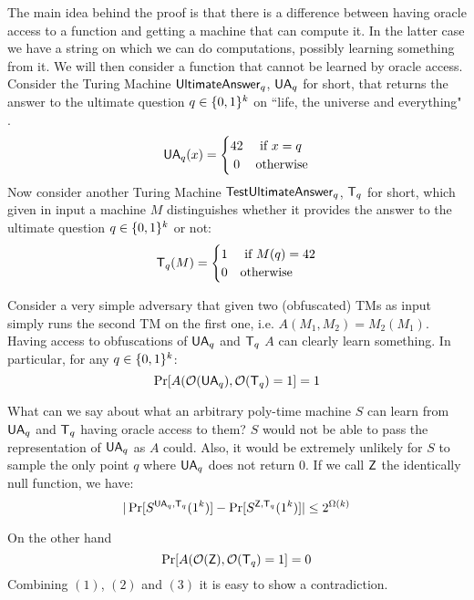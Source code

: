 The main idea behind the proof is that there is a difference between having oracle access to a function and getting a machine that can compute it. In the latter case we have a string on which we can do computations, possibly learning something from it.
We will then consider a function that cannot be learned by oracle access. Consider the Turing Machine
 $\mathsf{UltimateAnswer}_q$, $\mathsf{UA}_q$ for short, that returns the 
 answer to the ultimate question $q \in \{0,1\}^k$ on ``life, the universe and everything" \cite{adams}.
\[
\UA_q(x) =
\begin{cases} 
\hfill 42    \hfill & \text{ if $x = q$} \\
\hfill 0 \hfill & \text{otherwise} \\
\end{cases}
\]
Now consider another Turing Machine $\mathsf{TestUltimateAnswer}_q$, $\mathsf{T}_q$ for short, which given in input a machine $M$ distinguishes whether it provides the answer to the ultimate question $q \in \{0,1\}^k$ or not:
\[
\T_q(M) =
\begin{cases} 
\hfill 1    \hfill & \text{ if $M(q) = 42$} \\
\hfill 0 \hfill & \text{otherwise} \\
\end{cases}
\]

Consider a very simple adversary that given two (obfuscated) TMs as input simply runs the second TM on the first one, i.e. $A(M_1, M_2) = M_2(M_1)$. Having access to obfuscations of $\mathsf{UA}_q$ and $\mathsf{T}_q$ $A$ can clearly learn something. In particular, for any $q \in \{0,1\}^k$:
\begin{equation} \Pr[A(\mathcal{O}(\mathsf{UA}_q), \mathcal{O}(\mathsf{T}_q) = 1] = 1 \end{equation}

What can we say about what an arbitrary poly-time machine $S$ can learn from $\mathsf{UA}_q$ and $\mathsf{T}_q$ having oracle access to them? $S$ would not be able to pass the representation of $\mathsf{UA}_q$ as $A$ could. Also, it would be extremely unlikely for $S$ to sample the only point $q$ where $\mathsf{UA}_q$ does not return $0$. If we call $\mathsf{Z}$ the identically null function, we have:
\begin{equation} |\Pr[S^{\mathsf{UA}_q, \mathsf{T}_q}(1^k)] - \Pr[S^{\mathsf{Z}, \mathsf{T}_q}(1^k)]| \leq 2^{\Omega(k)}\end{equation}

On the other hand \begin{equation} \Pr[A(\mathcal{O}(\mathsf{Z}), \mathcal{O}(\mathsf{T}_q) = 1] = 0 \end{equation}
Combining $(1)$, $(2)$ and $(3)$ it is easy to show a contradiction.

